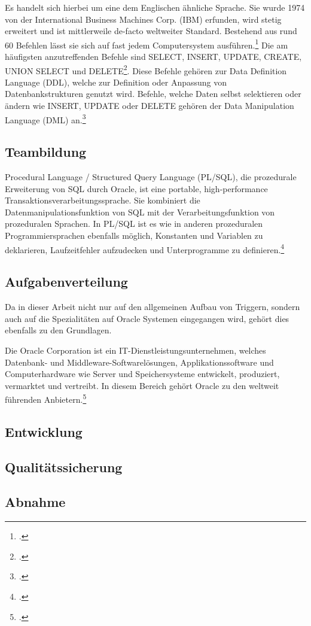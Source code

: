 Es handelt sich hierbei um eine dem Englischen ähnliche Sprache. Sie wurde 1974 von der International Business Machines Corp. (IBM) erfunden, wird stetig erweitert und ist mittlerweile de-facto weltweiter Standard. Bestehend aus rund 60 Befehlen lässt sie sich auf fast jedem Computersystem ausführen.\footcite[Vgl.][]{BusinessDictionary}
Die am häufigsten anzutreffenden Befehle sind SELECT, INSERT, UPDATE, CREATE, UNION SELECT und DELETE\footcite[Vgl.][Seite 486]{OlearySteele}.
Diese Befehle gehören zur Data Definition Language (DDL), welche zur Definition oder Anpassung von Datenbankstrukturen genutzt wird. Befehle, welche Daten selbst selektieren oder ändern wie INSERT, UPDATE oder DELETE gehören der Data Manipulation Language (DML) an.\footcite[Vgl.][]{UniversityofDelaware}

\subsection{Teambildung}
Procedural Language / Structured Query Language (PL/SQL), die prozedurale Erweiterung von SQL durch Oracle, ist eine portable, high-performance Transaktionsverarbeitungssprache. Sie kombiniert die Datenmanipulationsfunktion von SQL mit der Verarbeitungsfunktion von prozeduralen Sprachen. In PL/SQL ist es wie in anderen prozeduralen Programmiersprachen ebenfalls möglich, Konstanten und Variablen zu deklarieren, Laufzeitfehler aufzudecken und Unterprogramme zu definieren.\footcite[Vgl.][Seite 1-1 ff]{oracle}

\subsection{Aufgabenverteilung}
Da in dieser Arbeit nicht nur auf den allgemeinen Aufbau von Triggern, sondern auch auf die Spezialitäten auf Oracle Systemen eingegangen wird, gehört dies ebenfalls zu den Grundlagen.

Die Oracle Corporation ist ein IT-Dienstleistungsunternehmen, welches Datenbank- und Middleware-Softwarelösungen, Applikationssoftware und Computerhardware wie Server und Speichersysteme entwickelt, produziert, vermarktet und vertreibt. In diesem Bereich gehört Oracle zu den weltweit führenden Anbietern.\footcite[Vgl.][]{OracleCorp}

\subsection{Entwicklung}

\subsection{Qualitätssicherung}

\subsection{Abnahme}
